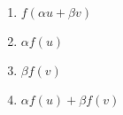 \documentclass[11pt,fleqn]{article}
\begin{document}
\begin{enumerate}
\begin{enumerate}
\begin{enumerate}
		\vspace{.7in}
		
		\item $f(\alpha u + \beta v)$\\
		
		\vspace{.7in}
		
		\item $\alpha f(u)$\\
		
		\vspace{.7in}
		
		\item $\beta f(v)$\\
		
		\vspace{.7in}
		
		\item $\alpha f(u) + \beta f(v)$\\
		
		\vspace{.7in}
		
		\end{enumerate}
		
	\end{enumerate}	
	
	\vfill

\end{enumerate}
\end{document}
